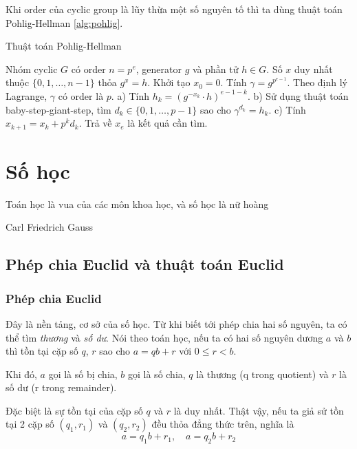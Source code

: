 \documentclass{mynotes}
\begin{document}
Khi order của cyclic group là lũy thừa một số nguyên tố thì ta dùng thuật toán Pohlig-Hellman \ref{alg:pohlig}.

\begin{algorithm}[H]
    \caption{Thuật toán Pohlig-Hellman}
    \label{alg:pohlig}
    \begin{algorithmic}[1]
        \Require Nhóm cyclic $G$ có order $n=p^e$, generator $g$ và phần tử $h \in G$.
        \Ensure Số $x$ duy nhất thuộc $\{ 0, 1, \ldots, n-1 \}$ thỏa $g^x = h$.
        \State Khởi tạo $x_0 = 0$.
        \State Tính $\gamma = g^{p^{e-1}}$. Theo định lý Lagrange, $\gamma$ có order là $p$.
            \State a) Tính $h_k = (g^{-x_k} \cdot h)^{e-1-k}$.
            \State b) Sử dụng thuật toán baby-step-giant-step, tìm $d_k \in \{ 0, 1, \ldots, p-1 \}$ sao cho $\gamma^{d_k} = h_k$. %
            \State c) Tính $x_{k+1} = x_k + p^k d_k$.
        \EndFor
        \State Trả về $x_e$ là kết quả cần tìm.
    \end{algorithmic}
\end{algorithm}

\chapter{Số học}

\epigraph{{\rmfamily Toán học là vua của các môn khoa học, và số học là nữ hoàng}}{Carl Friedrich Gauss}

\section{Phép chia Euclid và thuật toán Euclid}

\subsection*{Phép chia Euclid}

Đây là nền tảng, cơ sở của số học. Từ khi biết tới phép chia hai số nguyên, ta có thể tìm \textit{thương} và \textit{số dư}. Nói theo toán học, nếu ta có hai số nguyên dương $a$ và $b$ thì tồn tại cặp số $q$, $r$ sao cho $a = qb + r$ với $0 \leqslant r < b$.

Khi đó, $a$ gọi là số bị chia, $b$ gọi là số chia, $q$ là thương (q trong quotient) và $r$ là số dư (r trong remainder).

Đặc biệt là sự tồn tại của cặp số $q$ và $r$ là duy nhất. Thật vậy, nếu ta giả sử tồn tại 2 cặp số $(q_1, r_1)$ và $(q_2, r_2)$  đều thỏa đẳng thức trên, nghĩa là
\[a = q_1 b + r_1, \quad a = q_2 b + r_2\]
\end{document}
